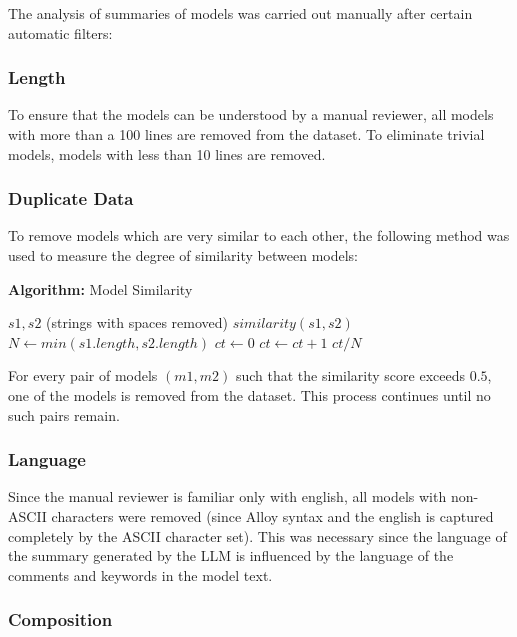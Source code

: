 \documentclass[conference]{IEEEtran}
\begin{document}
The analysis of summaries of models was carried out manually after certain automatic filters:

\subsubsection{Length}

To ensure that the models can be understood by a manual reviewer, all models with more than a 100 lines are removed from the dataset. To eliminate trivial models, models with less than 10 lines are removed.

\subsubsection{Duplicate Data}

To remove models which are very similar to each other, the following method was used to measure the degree of similarity between models:

\begin{center}
\textbf{Algorithm:} Model Similarity
\end{center}
\begin{algorithmic}[1]  %
\REQUIRE $s1, s2$ (strings with spaces removed)
\ENSURE $similarity(s1, s2)$
\STATE $N \gets min(s1.length ,s2.length)$
\STATE $ct \gets 0$
        \STATE $ct \gets ct + 1$
    \ENDIF
\ENDFOR
\RETURN $ct/N$
\end{algorithmic}
    
For every pair of models $(m1,m2)$ such that the similarity score exceeds $0.5$, one of the models is removed from the dataset. This process continues until no such pairs remain.

\subsubsection{Language}

Since the manual reviewer is familiar only with english, all models with non-ASCII characters were removed (since Alloy syntax and the english is captured completely by the ASCII character set). This was necessary since the language of the summary generated by the LLM is influenced by the language of the comments and keywords in the model text.

\subsubsection{Composition}
\end{document}
